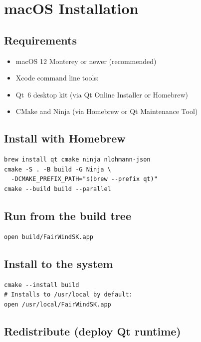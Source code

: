 \section{macOS Installation}
\label{app:macos}

\subsection{Requirements}

\begin{itemize}
  \item macOS 12 Monterey or newer (recommended)
  \item Xcode command line tools: 
  \item Qt~6 desktop kit (via Qt Online Installer or Homebrew)
  \item CMake and Ninja (via Homebrew or Qt Maintenance Tool)
\end{itemize}

\subsection{Install with Homebrew}

\begin{lstlisting}
brew install qt cmake ninja nlohmann-json
cmake -S . -B build -G Ninja \
  -DCMAKE_PREFIX_PATH="$(brew --prefix qt)"
cmake --build build --parallel
\end{lstlisting}

\subsection{Run from the build tree}

\begin{lstlisting}
open build/FairWindSK.app
\end{lstlisting}

\subsection{Install to the system}

\begin{lstlisting}
cmake --install build
# Installs to /usr/local by default:
open /usr/local/FairWindSK.app
\end{lstlisting}

\subsection{Redistribute (deploy Qt runtime)}

